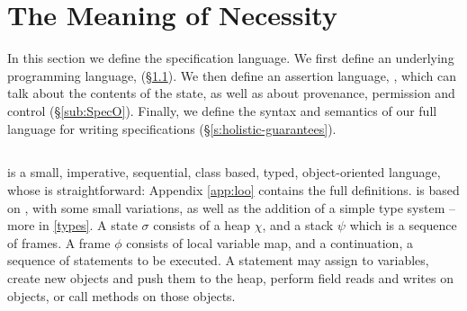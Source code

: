 \section{The Meaning of Necessity}
\label{s:semantics}

 
In this section we define {the}  \Nec specification language.  
We first define an underlying programming language, \Loo (\S \ref{sub:Loo}).
We then define an assertion language, \SpecO, which can talk about the
contents of the state, as well as about provenance, permission and
control (\S \ref{sub:SpecO}).  Finally, we define the syntax and
semantics of our full language for writing \Nec
specifications (\S \ref{s:holistic-guarantees}).


\subsection{\Loo}
\label{sub:Loo} 
 \Loo is a  {small}, imperative, sequential, 
class based, typed, object-oriented language, whose
\Loo is straightforward:
Appendix \ref{app:loo} contains 
the full definitions.
\Loo is based on \LangOO 
\cite{FASE}, with some small variations, as well as 
the addition of  %
 a simple type system -- more in \ref{types}.
%
%
A \Loo state $\sigma$ consists of a 
heap $\chi$, and a  {stack $\psi$ which is a sequence of frames}.
A frame $\phi$ consists of
local variable map, and a continuation, \ie a sequence of statements to be executed.
 A statement may assign to variables, create new objects and push them to the heap, 
perform field reads and writes on objects,  or
 call methods on those objects. 

